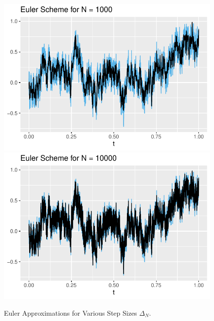 \begin{figure}[H]
    \includegraphics[scale=0.52]{fig/img/EulerScheme/EulerScheme1000.pdf}
    \includegraphics[scale=0.52]{fig/img/EulerScheme/EulerScheme10000.pdf}
    \caption{Euler Approximations for Various Step Sizes $\Delta_{N}$. }
    \label{fig:euler-scheme}
\end{figure}

